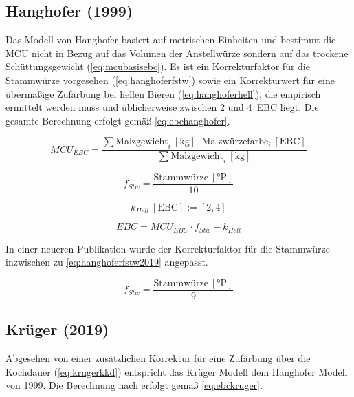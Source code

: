 \documentclass[a4paper,parskip=half]{scrartcl}
\newcommand{\MCUEBC}{\mathit{MCU}_{EBC}}
\newcommand{\EBC}{\mathit{EBC}}
\newcommand{\uebc}{\:[\textrm{EBC}]}
\newcommand{\ukg}{\:[\textrm{kg}]}
\newcommand{\uplato}{\:[\textrm{°P}]}
\newcommand{\fstw}{f_{Stw}}
\newcommand{\khell}{k_{Hell}}
\begin{document}
\subsection*{Hanghofer (1999)}

Das Modell von Hanghofer basiert auf metrischen Einheiten und bestimmt die MCU nicht in Bezug auf das Volumen der Anstellwürze sondern auf das trockene Schüttungsgewicht (\autoref{eq:mcubasisebc}). Es ist ein Korrekturfaktor für die Stammwürze vorgesehen (\autoref{eq:hanghoferfstw}) sowie ein Korrekturwert für eine übermäßige Zufärbung bei hellen Bieren (\autoref{eq:hanghoferhell}), die empirisch ermittelt werden muss und üblicherweise zwischen 2 und 4~EBC liegt. Die gesamte Berechnung erfolgt gemäß \autoref{eq:ebchanghofer}. \parencite[76]{Hanghofer1999}

\begin{equation}
\MCUEBC = \frac{\sum \text{Malzgewicht}_i \ukg \cdot \text{Malzwürzefarbe}_i \uebc}{\sum \text{Malzgewicht}_i \ukg} 
\label{eq:mcubasisebc}
\end{equation}

\begin{equation}
\fstw = \frac{\text{Stammwürze} \uplato}{10}
\label{eq:hanghoferfstw}
\end{equation}

\begin{equation}
\khell \uebc := \left[2, 4 \right]
\label{eq:hanghoferhell}
\end{equation}

\begin{equation}
\EBC = \MCUEBC \cdot \fstw + \khell
\label{eq:ebchanghofer}
\end{equation}

In einer neueren Publikation wurde der Korrekturfaktor für die Stammwürze inzwischen zu \autoref{eq:hanghoferfstw2019} angepasst. \parencite[78]{Hanghofer2019}

\begin{equation}
\fstw = \frac{\text{Stammwürze} \uplato}{9}
\label{eq:hanghoferfstw2019}
\end{equation}

\subsection*{Krüger (2019)}

Abgesehen von einer zusätzlichen Korrektur für eine Zufärbung über die Kochdauer (\autoref{eq:krugerkkd}) entspricht das Krüger Modell dem Hanghofer Modell von 1999. Die Berechnung nach \textcite{Krueger2019} erfolgt gemäß \autoref{eq:ebckruger}.
\end{document}
